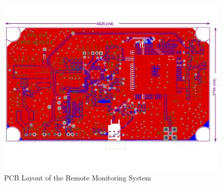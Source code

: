 \begin{figure}[H]
    \centering
    \includegraphics[width=\textwidth]{images/pcb.png}
    \caption{PCB Layout of the Remote Monitoring System}
    \label{fig:pcb_rms}
\end{figure}